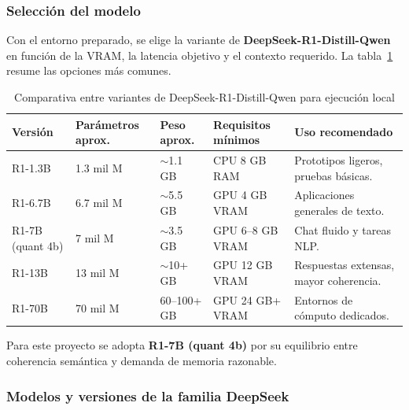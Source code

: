 \documentclass[12pt,a4paper]{report}
\numberwithin{figure}{section}
\begin{document}
\vspace{1em}
\subsubsection{Selección del modelo}
\label{subsubsec:seleccion_modelo}

Con el entorno preparado, se elige la variante de \textbf{DeepSeek-R1-Distill-Qwen} en función de la VRAM, la latencia objetivo y el contexto requerido. La tabla~\ref{tab:versiones_deepseek_r1_lm} resume las opciones más comunes.

\begin{table}[h!]
\centering
\caption{Comparativa entre variantes de DeepSeek-R1-Distill-Qwen para ejecución local}
\label{tab:versiones_deepseek_r1_lm}
\renewcommand{\arraystretch}{1.2}
\footnotesize
\begin{tabular}{@{}p{2.7cm} p{3cm} p{3cm} p{3.2cm} p{4.1cm}@{}}
\toprule
\textbf{Versión} & \textbf{Parámetros aprox.} & \textbf{Peso aprox.} & \textbf{Requisitos mínimos} & \textbf{Uso recomendado} \\
\midrule
R1-1.3B & 1.3 mil M & \(\sim\)1.1 GB & CPU 8 GB RAM & Prototipos ligeros, pruebas básicas. \\
R1-6.7B & 6.7 mil M & \(\sim\)5.5 GB & GPU 4 GB VRAM & Aplicaciones generales de texto. \\
R1-7B (quant 4b) & 7 mil M & \(\sim\)3.5 GB & GPU 6–8 GB VRAM & Chat fluido y tareas NLP. \\
R1-13B & 13 mil M & \(\sim\)10+ GB & GPU 12 GB VRAM & Respuestas extensas, mayor coherencia. \\
R1-70B & 70 mil M & 60–100+ GB & GPU 24 GB+ VRAM & Entornos de cómputo dedicados. \\
\bottomrule
\end{tabular}
\end{table}

Para este proyecto se adopta \textbf{R1-7B (quant 4b)} por su equilibrio entre coherencia semántica y demanda de memoria razonable.

\vspace{1em}
\subsubsection{Modelos y versiones de la familia DeepSeek}
\label{subsubsec:modelos_versiones}
\end{document}
